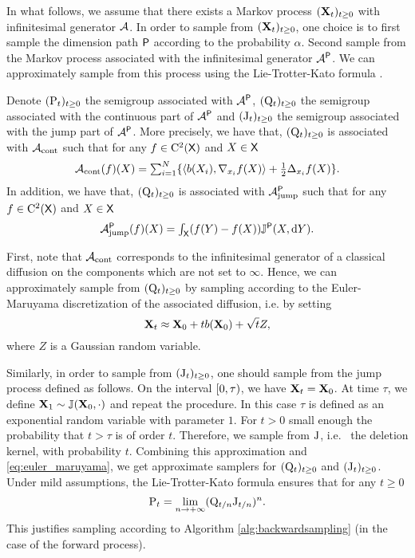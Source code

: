 In what follows, we assume that there exists a Markov process
$(\mathbf{X}_t)_{t \geq 0}$ with infinitesimal generator $\mathcal{A}$. In order to sample
from $(\mathbf{X}_t)_{t \geq 0}$, one choice is to first sample the dimension path
$\mathsf{P}$ according to the probability $\alpha$. Second sample from the Markov
process associated with the infinitesimal generator $\mathcal{A}^{\mathsf{P}}$. We can
approximately sample from this process using the Lie-Trotter-Kato formula
\cite[Corollary 6.7, p.33]{ethier2009markov}.

Denote $(\mathrm{P}_t)_{t \geq 0}$ the semigroup associated with $\mathcal{A}^{\mathsf{P}}$,
$(\mathrm{Q}_t)_{t \geq 0}$ the semigroup associated with the continuous part of
$\mathcal{A}^{\mathsf{P}}$ and $(\mathrm{J}_t)_{t \geq 0}$ the semigroup associated with the jump
part of $\mathcal{A}^{\mathsf{P}}$. More precisely, we have that, $(\mathrm{Q}_t)_{t \geq 0}$ is
associated with $\mathcal{A}_{\mathrm{cont}}$ such that for any $f \in \mathrm{C}^2(\mathsf{X})$
and $X \in \mathsf{X}$
\begin{equation}
  \textstyle \mathcal{A}_{\mathrm{cont}}(f)(X) = \sum_{i=1}^N \{ \langle b(X_i), \nabla_{x_i}f(X) \rangle + \tfrac{1}{2} \Delta_{x_i}f(X)\} . 
\end{equation}
In addition, we have that, $(\mathrm{Q}_t)_{t \geq 0}$ is
associated with $\mathcal{A}_{\mathrm{jump}}^{\mathsf{P}}$ such that for any $f \in \mathrm{C}^2(\mathsf{X})$
and $X \in \mathsf{X}$
\begin{equation}
  \textstyle \mathcal{A}_{\mathrm{jump}}^{\mathsf{P}}(f)(X) = \int_{\mathsf{X}} (f(Y)-f(X)) \mathbb{J}^{\mathsf{P}}(X, \mathrm{d} Y) . 
\end{equation}

First, note that $\mathcal{A}_{\mathrm{cont}}$ corresponds to the infinitesimal
generator of a classical diffusion on the components which are not set to
$\infty$. Hence, we can approximately sample from $(\mathrm{Q}_t)_{t \geq 0}$ by
sampling according to the Euler-Maruyama discretization of the associated
diffusion, i.e. by setting
\begin{equation}
  \label{eq:euler_maruyama}
  \mathbf{X}_t \approx \mathbf{X}_0 + t b(\mathbf{X}_0) + \sqrt{t} Z , 
\end{equation}
where $Z$ is a Gaussian random variable.

Similarly, in order to sample from $(\mathrm{J}_t)_{t \geq 0}$, one should sample
from the jump process defined as follows. On the interval $[ 0, \tau )$, we
have $\mathbf{X}_t = \mathbf{X}_0$. At time $\tau$, we define
$\mathbf{X}_1 \sim \mathbb{J}(\mathbf{X}_0, \cdot)$ and repeat the procedure. In this case $\tau$
is defined as an exponential random variable with parameter $1$. For $t > 0$
small enough the probability that $t > \tau$ is of order $t$. Therefore, we
sample from $\mathrm{J}$, i.e.~ the deletion kernel, with probability $t$. Combining
this approximation and \eqref{eq:euler_maruyama}, we get approximate samplers
for $(\mathrm{Q}_t)_{t \geq 0}$ and $(\mathrm{J}_t)_{t \geq 0}$. Under mild assumptions,
the Lie-Trotter-Kato formula ensures that for any $t \geq 0$
\begin{equation}
  \mathrm{P}_t = \lim_{n \to +\infty} (\mathrm{Q}_{t/n} \mathrm{J}_{t/n})^n . 
\end{equation}
This justifies sampling according to Algorithm \ref{alg:backwardsampling} (in
the case of the forward process).

